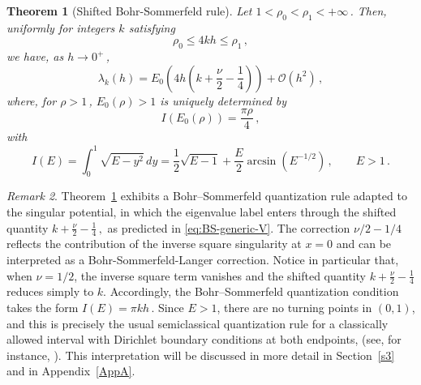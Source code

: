 \documentclass[11pt]{amsart}
\numberwithin{equation}{section}
\newtheorem{theorem}{Theorem}[section]
\theoremstyle{remark}
\newtheorem{remark}[theorem]{Remark}
\begin{document}
\begin{theorem}[Shifted Bohr-Sommerfeld rule]\label{thm:supercritical-intro}
Let $1<\rho_0<\rho_1<+\infty$\,. Then, uniformly for integers $k$ satisfying
\[
\rho_0\leq 4kh\leq \rho_1\,,
\]
we have, as $h\to0^+$\,,
\[
\lambda_k(h)
=
E_0\left(
4h\left(k+\frac{\nu}{2}-\frac14\right)
\right)
+\mathcal O(h^2)\,,
\]
where, for $\rho>1\,$,  $E_0(\rho)>1$ is uniquely determined by 
\[
I(E_0(\rho))=\frac{\pi\rho}{4}\,,
\]
with
\[
I(E)
=
\int_0^1\sqrt{E-y^2}\,dy
=
\frac12\sqrt{E-1}
+
\frac{E}{2}\arcsin(E^{-1/2})\,,
\qquad E>1\,.
\]
\end{theorem}
%
%
\begin{remark}\label{rempostth}
Theorem~\ref{thm:supercritical-intro} exhibits a
Bohr--Sommerfeld quantization rule adapted to the singular potential,
in which the eigenvalue label enters through the shifted quantity
$
k+\frac{\nu}{2}-\frac14\,,
$ as predicted in \eqref{eq:BS-generic-V}.
The correction $\nu/2-1/4$ reflects the contribution of the inverse
square singularity at $x=0$ and can be interpreted as a
Bohr-Sommerfeld-Langer correction. Notice in particular that, when $\nu=1/2$, the inverse square term
vanishes and the shifted quantity
$
k+\frac{\nu}{2}-\frac14
$
reduces simply to $k$. Accordingly, the Bohr--Sommerfeld quantization condition takes the form
$
I(E)=\pi kh\,.
$
Since $E>1$, there are no turning points in $(0,1)$, and this is
precisely the usual semiclassical quantization rule for a classically
allowed interval with Dirichlet boundary conditions at both endpoints, (see, for instance, \cite[Chapter~6, Section~9, Eq.~(9.05)]{Olver}). This interpretation will be discussed in more detail in
Section~\ref{s3} and in Appendix~\ref{AppA}.
\end{remark}
\end{document}
